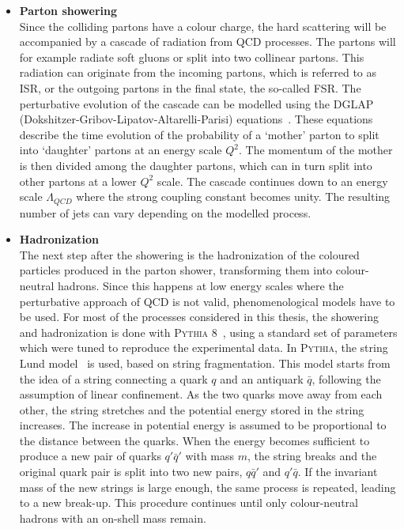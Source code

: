\begin{itemize}
 \item[] \textbf{Parton showering}\\
Since the colliding partons have a colour charge, the hard scattering will be accompanied by a cascade of radiation from \acs{QCD} processes. The partons will for example radiate soft gluons or split into two collinear partons. This radiation can originate from the incoming partons, which is referred to as \ac{ISR}, or the outgoing partons in the final state, the so-called \ac{FSR}. The perturbative evolution of the cascade can be modelled using the DGLAP (Dokshitzer-Gribov-Lipatov-Altarelli-Parisi) equations~\cite{Gribov:1972ri, Dokshitzer:1977sg, Altarelli:1977zs}. These equations describe the time evolution of the probability of a `mother' parton to split into `daughter' partons at an energy scale $Q^2$. The momentum of the mother is then divided among the daughter partons, which can in turn split into other partons at a lower $Q^2$ scale. The cascade continues down to an energy scale $\Lambda_{QCD}$ where the strong coupling constant becomes unity. The resulting number of jets can vary depending on the modelled process.
% 

\item[] \textbf{Hadronization}\\
The next step after the showering is the hadronization of the coloured particles produced in the parton shower, transforming them into colour-neutral hadrons. Since this happens at low energy scales where the perturbative approach of \acs{QCD} is not valid, phenomenological models have to be used. For most of the processes considered in this thesis, the showering and hadronization is done with \textsc{Pythia 8}~\cite{Sjostrand:2006za}, using a standard set of parameters which were tuned to reproduce the experimental data. In \textsc{Pythia}, the string Lund model~\cite{Andersson:1983ia} is used, based on string fragmentation. This model starts from the idea of a string connecting a quark $q$ and an antiquark $\bar{q}$, following the assumption of linear confinement. As the two quarks move away from each other, the string stretches and the potential energy stored in the string increases. The increase in potential energy is assumed to be proportional to the distance between the quarks. When the energy becomes sufficient to produce a new pair of quarks $q'\bar{q}'$ with mass $m$, the string breaks and the original quark pair is split into two new pairs, $q\bar{q}'$ and $q'\bar{q}$. If the invariant mass of the new strings is large enough, the same process is repeated, leading to a new break-up. This procedure continues until only colour-neutral hadrons with an on-shell mass remain.


\end{itemize}
